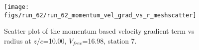 \begin{figure}[H]
\centering
\texttt{[image: figs/run\_62/run\_62\_momentum\_vel\_grad\_vs\_r\_meshscatter]}
\caption{Scatter plot of the momentum based velocity gradient term vs radius at $z/c$=10.00, $V_{free}$=16.98, station 7.}
\label{fig:run_62_momentum_vel_grad_vs_r_meshscatter}
\end{figure}


